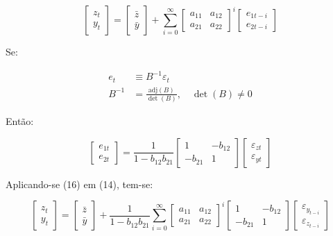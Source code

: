 \begin{equation}\begin{bmatrix} z_t \\    y_t 
\end{bmatrix}=\begin{bmatrix} \bar{z} \\    \bar{y}
\end{bmatrix}+\sum_{i=0}^{\infty}\begin{bmatrix}
    a_{11} & a_{12} \\a_{21} & a_{22}\end{bmatrix}^{i}
\begin{bmatrix}    e_{1t-i} \\    e_{2t-i}
\end{bmatrix}\end{equation}

Se: 

\begin{equation}\begin{aligned}
    e_t &\equiv B^{-1}\varepsilon_t \\
    B^{-1} &= \frac{\text{adj}(B)}{\det(B)}, \quad \det(B) \neq 0\end{aligned}\end{equation}


Então:

\begin{equation}\begin{bmatrix} e_{1t} \\ e_{2t}\end{bmatrix}=\frac{1}{1 - b_{12}b_{21}}
\begin{bmatrix}  1 & -b_{12} \\    -b_{21} & 1
\end{bmatrix}\begin{bmatrix} \varepsilon_{zt} \\
    \varepsilon_{yt}\end{bmatrix}\end{equation}


Aplicando-se (16) em (14), tem-se:

\begin{equation}\begin{bmatrix}z_t \\y_t
\end{bmatrix}=\begin{bmatrix}\bar{z} \\\bar{y}
\end{bmatrix}+\frac{1}{1 - b_{12}b_{21}}\sum_{i=0}^{\infty}
\begin{bmatrix}a_{11} & a_{12} \\a_{21} & a_{22}
\end{bmatrix}^{i}\begin{bmatrix}1 & -b_{12} \\
-b_{21} & 1\end{bmatrix}\begin{bmatrix}
\varepsilon_{y_{t-i}} \\\varepsilon_{z_{t-i}}
\end{bmatrix}\end{equation}


